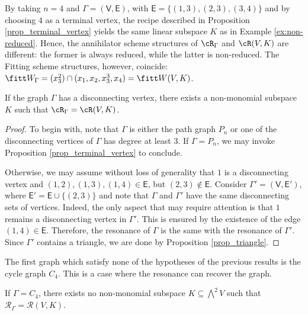 \documentclass[10pt, leqno]{amsart}
\begin{document}
\begin{exmp}
By taking $n = 4$ and $\Gamma = (\mathsf{V}, \mathsf{E})$, with $\mathsf{E} = \{(1,3), (2,3), (3,4) \}$ and by choosing $4$ as a terminal vertex, the recipe described in Proposition \ref{prop_terminal_vertex} yields the same linear subspace $K$ as in Example \ref{ex:non-reduced}. Hence, the annihilator scheme structures of $\cR_\Gamma$ and $\cR(V,K)$ are different: the former is always reduced, while the latter is non-reduced. The Fitting scheme structures, however, coincide: $\fitt W_\Gamma = (x_3^2) \cap (x_1, x_2, x_3^3, x_4) = \fitt W(V,K)$.
\end{exmp}

\begin{prop} \label{prop_disconnecting_vertex}
If the graph $\Gamma$ has a disconnecting vertex, there exists a non-monomial subspace $K$ such that $\cR_\Gamma = \cR(V,K)$.
\end{prop}

\begin{proof}
To begin with, note that $\Gamma$ is either the path graph $P_n$ or one of the disconnecting vertices of $\Gamma$ has degree at least $3$. If $\Gamma = P_n$, we may invoke Proposition \ref{prop_terminal_vertex} to conclude.

Otherwise, we may assume without loss of generality that $1$ is a disconnecting vertex and $(1,2), (1,3), (1,4) \in \mathsf{E}$, but $(2,3) \notin \mathsf{E}$. Consider $\Gamma' = (\mathsf{V}, \mathsf{E'})$, where $\mathsf{E'} = \mathsf{E} \cup \{(2,3)\}$ and note that $\Gamma$ and $\Gamma'$ have the same disconnecting sets of vertices. Indeed, the only aspect that may require attention is that $1$ remains a disconnecting vertex in $\Gamma'$. This is ensured by the existence of the edge $(1,4) \in \mathsf{E}$.  Therefore, the resonance of $\Gamma$ is the same with the resonance of $\Gamma'$. Since $\Gamma'$ contains a triangle, we are done by Proposition \ref{prop_triangle}. 
\end{proof}

The first graph which satisfy none of the hypotheses of the previous results is the cycle graph $C_4$. This is a case where the resonance can recover the graph.

\begin{prop} \label{prop_C4}
If $\Gamma = C_4$, there exists no non-monomial subspace $K \subseteq \bigwedge^2V$ such that $\mathcal{R}_\Gamma = \mathcal{R}(V,K)$.
\end{prop}
\end{document}

